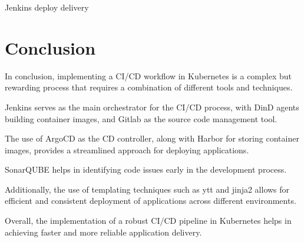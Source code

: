 \begin{listing}[H]
    \inputminted[firstline=11,lastline=45]{Dockerfile}{codeListing/Jenkinsfile_deploy_delivery}
\end{listing}

\begin{listing}[H]
    \inputminted[firstline=46]{Dockerfile}{codeListing/Jenkinsfile_deploy_delivery}
    \caption{Jenkins deploy delivery}
    \label{lst:jenkinsfile_deploy_delivery}
\end{listing}

\section*{Conclusion}
In conclusion, implementing a CI/CD workflow in Kubernetes is a complex but rewarding process that requires a combination of different tools and techniques. 

Jenkins serves as the main orchestrator for the CI/CD process, with DinD agents building container images, and Gitlab as the source code management tool. 

The use of ArgoCD as the CD controller, along with Harbor for storing container images, provides a streamlined approach for deploying applications. 

SonarQUBE helps in identifying code issues early in the development process. 

Additionally, the use of templating techniques such as ytt and jinja2 allows for efficient and consistent deployment of applications across different environments.  

Overall, the implementation of a robust CI/CD pipeline in Kubernetes helps in achieving faster and more reliable application delivery.